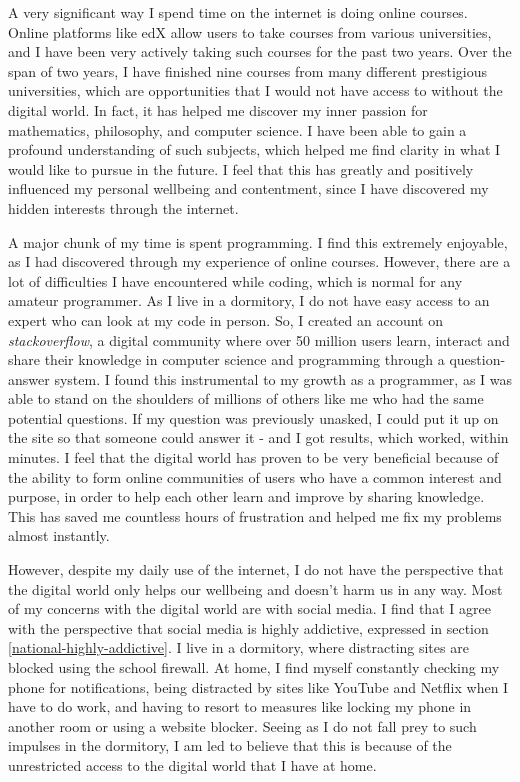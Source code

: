\documentclass[a4paper, 11pt]{article}
\begin{document}
A very significant way I spend time on the internet is doing online courses. Online platforms like edX allow users to take courses from various universities, and I have been very actively taking such courses for the past two years. Over the span of two years, I have finished nine courses from many different prestigious universities, which are opportunities that I would not have access to without the digital world. In fact, it has helped me discover my inner passion for mathematics, philosophy, and computer science. I have been able to gain a profound understanding of such subjects, which helped me find clarity in what I would like to pursue in the future. I feel that this has greatly and positively influenced my personal wellbeing and contentment, since I have discovered my hidden interests through the internet.

A major chunk of my time is spent programming. I find this extremely enjoyable, as I had discovered through my experience of online courses. However, there are a lot of difficulties I have encountered while coding, which is normal for any amateur programmer. As I live in a dormitory, I do not have easy access to an expert who can look at my code in person. So, I created an account on \emph{stackoverflow}, a digital community where over 50 million users learn, interact and share their knowledge in computer science and programming through a question-answer system. I found this instrumental to my growth as a programmer, as I was able to stand on the shoulders of millions of others like me who had the same potential questions. If my question was previously unasked, I could put it up on the site so that someone could answer it - and I got results, which worked, within minutes. I feel that the digital world has proven to be very beneficial because of the ability to form online communities of users who have a common interest and purpose, in order to help each other learn and improve by sharing knowledge. This has saved me countless hours of frustration and helped me fix my problems almost instantly.

However, despite my daily use of the internet, I do not have the perspective that the digital world only helps our wellbeing and doesn't harm us in any way. Most of my concerns with the digital world are with social media. I find that I agree with the perspective that social media is highly addictive, expressed in section \ref{national-highly-addictive}. I live in a dormitory, where distracting sites are blocked using the school firewall. At home, I find myself constantly checking my phone for notifications, being distracted by sites like YouTube and Netflix when I have to do work, and having to resort to measures like locking my phone in another room or using a website blocker. Seeing as I do not fall prey to such impulses in the dormitory, I am led to believe that this is because of the unrestricted access to the digital world that I have at home.
\end{document}
